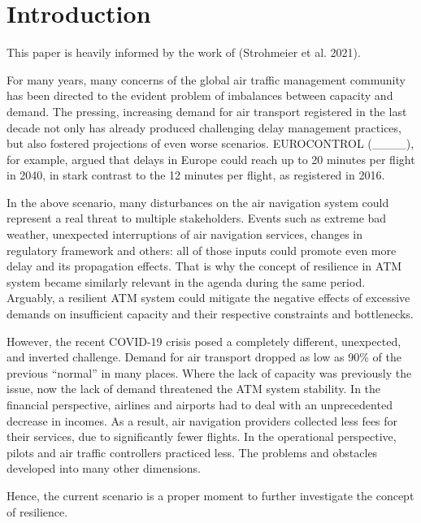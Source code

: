 \documentclass[conference,final,]{IEEEtran}
\begin{document}
\hypertarget{introduction}{%
\section{Introduction}\label{introduction}}

This paper is heavily informed by the work of (Strohmeier et al. 2021).

For many years, many concerns of the global air traffic management community has been directed to the evident problem of imbalances between capacity and demand. The pressing, increasing demand for air transport registered in the last decade not only has already produced challenging delay management practices, but also fostered projections of even worse scenarios. EUROCONTROL (\_\_\_\_), for example, argued that delays in Europe could reach up to 20 minutes per flight in 2040, in stark contrast to the 12 minutes per flight, as registered in 2016.

In the above scenario, many disturbances on the air navigation system could represent a real threat to multiple stakeholders. Events such as extreme bad weather, unexpected interruptions of air navigation services, changes in regulatory framework and others: all of those inputs could promote even more delay and its propagation effects. That is why the concept of resilience in ATM system became similarly relevant in the agenda during the same period. Arguably, a resilient ATM system could mitigate the negative effects of excessive demands on insufficient capacity and their respective constraints and bottlenecks.

However, the recent COVID-19 crisis posed a completely different, unexpected, and inverted challenge. Demand for air transport dropped as low as 90\% of the previous ``normal'' in many places. Where the lack of capacity was previously the issue, now the lack of demand threatened the ATM system stability. In the financial perspective, airlines and airports had to deal with an unprecedented decrease in incomes. As a result, air navigation providers collected less fees for their services, due to significantly fewer flights. In the operational perspective, pilots and air traffic controllers practiced less. The problems and obstacles developed into many other dimensions.

Hence, the current scenario is a proper moment to further investigate the concept of resilience.
\end{document}
